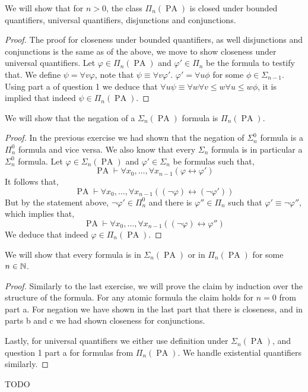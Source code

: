 \subquestion{}
We will show that for $n > 0$, the class $\Pi_n(\operatorname{PA})$ is closed under bounded quantifiers, universal quantifiers, disjunctions and conjunctions.
\begin{proof}
	The proof for closeness under bounded quantifiers, as well disjunctions and conjunctions is the same as of the above, we move to show closeness under universal quantifiers.
	Let $\varphi \in \Pi_n(\operatorname{PA})$ and $\varphi' \in \Pi_n$ be the formula to testify that.
	We define $\psi = \forall v \varphi$, note that $\psi \equiv \forall v \varphi'$.
	$\varphi' = \forall u \phi$ for some $\phi \in \Sigma_{n - 1}$.
	Using part a of question 1 we deduce that $\forall u \psi \equiv \forall w \forall v \le w \forall u \le w \phi$, it is implied that indeed $\psi \in \Pi_n(\operatorname{PA})$.
\end{proof}

\subquestion{}
We will show that the negation of a $\Sigma_n(\operatorname{PA})$ formula is $\Pi_n(\operatorname{PA})$.
\begin{proof}
	In the previous exercise we had shown that the negation of $\Sigma_n^0$ formula is a $\Pi_n^0$ formula and vice versa.
	We also know that every $\Sigma_n$ formula is in particular a $\Sigma_n^0$ formula.
	Let $\varphi \in \Sigma_n(\operatorname{PA})$ and $\varphi' \in \Sigma_n$ be formulas such that,
	\[
		\operatorname{PA} \vdash \forall x_0, \ldots, \forall x_{n - 1} (\varphi \leftrightarrow \varphi')
	\]
	It follows that,
	\[
		\operatorname{PA} \vdash \forall x_0, \ldots, \forall x_{n - 1} ((\lnot \varphi) \leftrightarrow (\lnot \varphi'))
	\]
	But by the statement above, $\lnot \varphi' \in \Pi_n^0$ and there is $\varphi'' \in \Pi_n$ such that $\varphi' \equiv \lnot \varphi''$,
	which implies that,
	\[
		\operatorname{PA} \vdash \forall x_0, \ldots, \forall x_{n - 1} ((\lnot \varphi) \leftrightarrow \varphi'')
	\]
	We deduce that indeed $\varphi \in \Pi_n(\operatorname{PA})$.
\end{proof}

\subquestion{}
We will show that every formula is in $\Sigma_n(\operatorname{PA})$ or in $\Pi_n(\operatorname{PA})$ for some $n \in \mathbb{N}$.
\begin{proof}
	Similarly to the last exercise, we will prove the claim by induction over the structure of the formula.
	For any atomic formula the claim holds for $n = 0$ from part a.
	For negation we have shown in the last part that there is closeness, and in parts b and c we had shown closeness for conjunctions.

	Lastly, for universal quantifiers we either use definition under $\Sigma_n(\operatorname{PA})$, and question 1 part a for formulas from $\Pi_n(\operatorname{PA})$.
	We handle existential quantifiers similarly.
\end{proof}

\question{}
TODO


